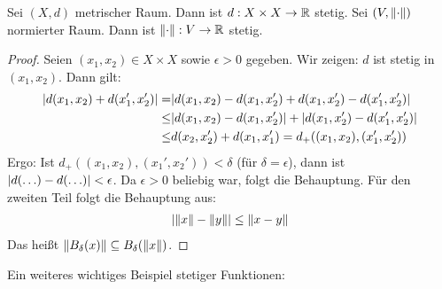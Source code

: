 \begin{Proposition}{%
	Sei $(X,d)$ metrischer Raum. Dann ist $d: X \times X \rightarrow \mathbb{R}$ stetig. 
	Sei $(V, \norm{\cdot})$ normierter Raum. Dann ist $\norm{\cdot} : V \rightarrow 
	\mathbb{R}$ stetig.
}\end{Proposition}

\begin{proof}
	Seien $(x_1, x_2) \in X \times X$ sowie $\epsilon > 0$ gegeben. Wir zeigen: 
	$d$ ist stetig in $(x_1, x_2)$.
	Dann gilt:
	\begin{align*}
		\abs{d(x_1,x_2) + d(x_1', x_2')} = & 
		\abs{d(x_1,x_2) - d(x_1, x_2') 
			+ d(x_1,x_2') - d(x_1',x_2')} \\ \leq &
		\abs{d(x_1,x_2) - d(x_1, x_2')} + 
			\abs{d(x_1,x_2')-d(x_1',x_2')} \\ \leq &
		d(x_2, x_2') + d(x_1, x_1') = 
		d_+ ((x_1,x_2), (x_1', x_2'))
	\end{align*}
	Ergo: Ist $d_+((x_1,x_2), (x_1',x_2')) < \delta$ (für $\delta = 
	\epsilon$), dann ist $\abs{d(\hdots) - d(\hdots)} < \epsilon$. 
	Da $\epsilon > 0$ beliebig war, folgt die Behauptung. 
	Für den zweiten Teil folgt die Behauptung aus:
	\begin{align*}
		\abs{\norm{x} - \norm{y}} \leq \norm{x-y}
	\end{align*}
	Das heißt $\norm{B_\delta(x)} \subseteq B_\delta(\norm{x})$.
\end{proof}
Ein weiteres wichtiges Beispiel stetiger Funktionen: \\
